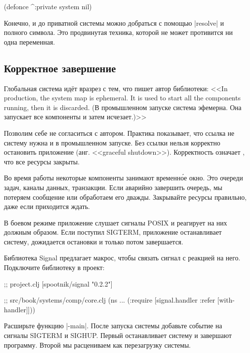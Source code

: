 \begin{english}
  \begin{clojure}
(defonce ^:private system nil)
  \end{clojure}
\end{english}

Конечно, и до приватной системы можно добраться с помощью \spverb|resolve| и
полного символа. Это продвинутая техника, которой не может противится ни одна
переменная.

\subsection{Корректное завершение}

Глобальная система ид\"{е}т вразрез с тем, что пишет автор библиотеки: <<In
production, the system map is ephemeral. It is used to start all the components
running, then it is discarded. (В промышленном запуске система эфемерна. Она
запускает все компоненты и затем исчезает.)>>

Позволим себе не согласиться с автором. Практика показывает, что ссылка не
систему нужна и в промышленном запуске. Без ссылки нельзя корректно остановить
приложение (анг. <<graceful shutdown>>). Корректность означает , что все ресурсы
закрыты.

Во время работы некоторые компоненты занимают временн\'{о}е окно. Это очереди
задач, каналы данных, транзакции. Если аварийно завершить очередь, мы потеряем
сообщение или обработаем его дважды. Закрывайте ресурсы правильно, даже если
приходится ждать.

В боевом режиме приложение слушает сигналы POSIX и реагирует на них должным
образом. Если поступил SIGTERM, приложение останавливает систему, дожидается
остановки и только потом завершается.

Библиотека Signal предлагает макрос,
чтобы связать сигнал с реакцией на него. Подключите библиотеку в проект:

\begin{english}
  \begin{clojure}
;; project.clj
[spootnik/signal "0.2.2"]

;; src/book/systems/comp/core.clj
(ns ...
  (:require [signal.handler :refer [with-handler]]))
  \end{clojure}
\end{english}

Расширьте функцию \spverb|-main|. После запуска системы добавьте событие на
сигналы SIGTERM и SIGHUP. Первый останавливает систему и завершают
программу. Второй мы расцениваем как перезагрузку системы.

